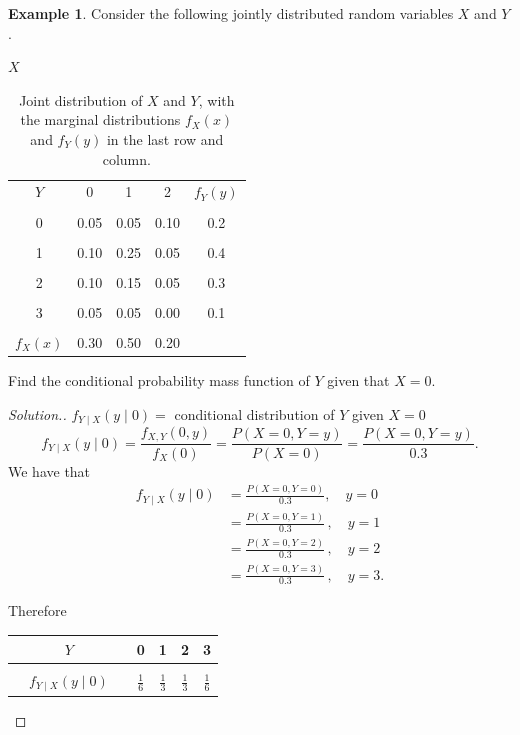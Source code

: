 \documentclass[12pt,a4paper]{report}
\theoremstyle{definition}
\newtheorem{example}[thm]{Example}
\theoremstyle{plain}
\theoremstyle{definition}
\begin{document}
\begin{example}
Consider the following jointly distributed random variables $X$ and $Y$.

\begin{table}[H]
\centering
$X$\\
\begin{tabular}{ccccc}
$Y$ & 0 & 1 & 2 & $f_Y(y)$\\
&&&&\\
\hline
0 & 0.05 & 0.05 & 0.10 & 0.2\\
 &&&&\\
1 & 0.10 & 0.25 & 0.05 & 0.4\\
&&&&\\
2 & 0.10 & 0.15 & 0.05 & 0.3\\
&&&&\\
3 & 0.05 & 0.05 & 0.00 & 0.1\\
&&&&\\
\hline
$f_X(x)$ & 0.30 & 0.50 & 0.20 & \\
\end{tabular}
\caption{Joint distribution of $X$ and $Y$, with the marginal distributions $f_X(x)$ and $f_Y(y)$ in the last row and column.}
\end{table}
Find the conditional probability mass function of $Y$ given that $X = 0$. 
\end{example}



\begin{proof}[\textit{Solution.}]
 $f_{Y\mid X}(y\mid 0)=$ conditional distribution of $Y$ given $X=0$
\[f_{Y\mid X}(y\mid 0)=\frac{f_{X,Y}(0,y)}{f_X(0)}=\frac{P(X=0,Y=y)}{P(X=0)}=\frac{P(X=0,Y=y)}{0.3}.\]
We have that
\begin{align*}
f_{Y\mid X}(y\mid 0) & =  \frac{P(X=0,Y=0)}{0.3}, \quad y = 0\\
             & = \frac{P(X=0,Y=1)}{0.3}\, , \quad y = 1\\
             & =  \frac{P(X=0,Y=2)}{0.3}\, , \quad y = 2\\
             & =  \frac{P(X=0,Y=3)}{0.3}\, , \quad y = 3.
\end{align*}

Therefore
\begin{table}[H]
\centering
\begin{tabular}{ccc|cccc}
&$Y$ && 0 & 1 & 2 & 3\\
\hline
&&&&&&\\
&$f_{Y\mid X}(y\mid 0)$ && $\frac{1}{6}$ & $\frac{1}{3}$ & $\frac{1}{3}$ & $\frac{1}{6}$\\
\end{tabular}
\end{table}
\end{proof}
\end{document}
